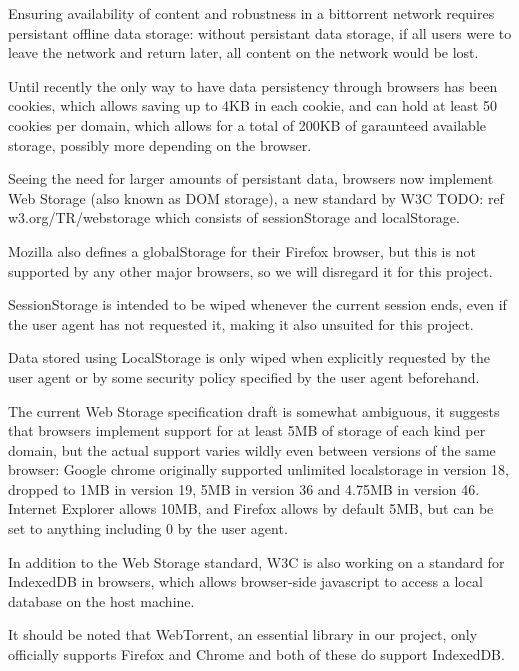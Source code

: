 Ensuring availability of content and robustness in a bittorrent network requires persistant offline data storage:
without persistant data storage, if all users were to leave the network and return later, all content on the 
network would be lost.
\newline

Until recently the only way to have data persistency through browsers has been cookies, 
which allows saving up to 4KB in each cookie, and can hold at least 50 cookies per domain, 
which allows for a total of 200KB of garaunteed available storage, possibly more depending on the browser.
\newline

Seeing the need for larger amounts of persistant data, browsers now implement Web Storage 
(also known as DOM storage),
a new standard by W3C
TODO: ref w3.org/TR/webstorage 
which consists of sessionStorage and localStorage.

Mozilla also defines a globalStorage for their Firefox browser, 
but this is not supported by any other major browsers, so we will disregard it for this project.

SessionStorage is intended to be wiped whenever the current session ends, 
even if the user agent has not requested it, making it also unsuited for this project.

Data stored using LocalStorage is only wiped when explicitly requested by the user agent or 
by some security policy specified by the user agent beforehand.
\newline

The current Web Storage specification draft is somewhat ambiguous, 
it suggests that browsers implement support for at least 5MB of storage of each kind per domain,
but the actual support varies wildly even between versions of the same browser:
Google chrome originally supported unlimited localstorage in version 18, dropped to 1MB in version 19, 
5MB in version 36 and 4.75MB in version 46. 
Internet Explorer allows 10MB, 
and Firefox allows by default 5MB, but can be set to anything including 0 by the user agent.
\newline

In addition to the Web Storage standard, W3C is also working on a standard for IndexedDB in browsers, 
which allows browser-side javascript to access a local database on the host machine.

It should be noted that WebTorrent, 
an essential library in our project, 
only officially supports Firefox and Chrome 
and both of these do support IndexedDB.
\newline

